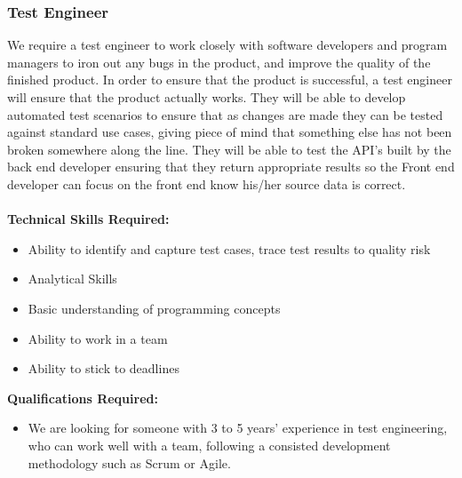 \documentclass[11pt, oneside, a4paper, titlepage]{article}
\begin{document}
\subsubsection{Test Engineer}
We require a test engineer to work closely with software developers and program managers to iron out any bugs in the product, and improve the quality of the finished product. In order to ensure that the product is successful, a test engineer will ensure that the product actually works.  They will be able to develop automated test scenarios to ensure that as changes are made they can be tested against standard use cases, giving piece of mind that something else has not been broken somewhere along the line.  They will be able to test the API's built by the back end developer ensuring that they return appropriate results so the Front  end developer can focus on the front end know his/her source data is correct. 
\\
\\
\textbf{Technical Skills Required:}
\begin{itemize}
	\item Ability to identify and capture test cases, trace test results to quality risk
	\item Analytical Skills
	\item Basic understanding of programming concepts
	\item Ability to work in a team
	\item Ability to stick to deadlines
\end{itemize}
\hfill \break
\textbf{Qualifications Required:}
\begin {itemize}
	\item We are looking for someone with 3 to 5 years' experience in test engineering, who can work well with a team, following a consisted development methodology such as Scrum or Agile.   
\end{itemize}
\newpage
\end{document}
